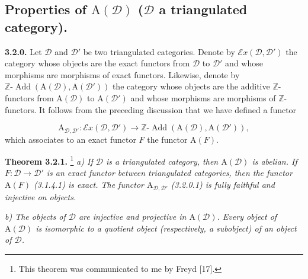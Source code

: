 \clearpage
{}%
\begingroup
\small
\setlength{\parskip}{0pt}%
\setlength{\emergencystretch}{1.5em}%

\subsection{Properties of
  \texorpdfstring{$\mathrm A(\mathcal D)$}{A(D)}
  (\texorpdfstring{$\mathcal D$}{D} a triangulated category).}

\noindent\textbf{3.2.0.}\quad
Let $\mathcal D$ and $\mathcal D'$ be two triangulated categories. Denote by
$\mathcal E x(\mathcal D,\mathcal D')$ the category whose objects are the
exact functors from $\mathcal D$ to $\mathcal D'$ and whose morphisms are
morphisms of exact functors. Likewise, denote by
$\mathbb Z\text{-}\operatorname{Add}(\mathrm A(\mathcal D),
\mathrm A(\mathcal D'))$ the category whose objects are the additive
$\mathbb Z$-functors from $\mathrm A(\mathcal D)$ to
$\mathrm A(\mathcal D')$ and whose morphisms are morphisms of
$\mathbb Z$-functors. It follows from the preceding discussion that we have
defined a functor

\[
\mathrm A_{\mathcal D,\mathcal D'}\colon
\mathcal E x(\mathcal D,\mathcal D')
\longrightarrow
\mathbb Z\text{-}\operatorname{Add}
(\mathrm A(\mathcal D),\mathrm A(\mathcal D')),
\tag{3.2.0.1}
\]
which associates to an exact functor $F$ the functor $\mathrm A(F)$.

\medskip
\noindent\textbf{Theorem 3.2.1.}\begingroup\renewcommand{\thefootnote}{(*)}%
\footnote{This theorem was communicated to me by Freyd [17].}\endgroup\quad
\textit{a) If $\mathcal D$ is a triangulated category, then
$\mathrm A(\mathcal D)$ is abelian. If
$F\colon\mathcal D\to\mathcal D'$ is an exact functor between triangulated
categories, then the functor $\mathrm A(F)$ (3.1.4.1) is exact. The functor
$\mathrm A_{\mathcal D,\mathcal D'}$ (3.2.0.1) is fully faithful and
injective on objects.}

\textit{b) The objects of $\mathcal D$ are injective and projective in
$\mathrm A(\mathcal D)$. Every object of $\mathrm A(\mathcal D)$ is
isomorphic to a quotient object (respectively, a subobject) of an object of
$\mathcal D$.}

